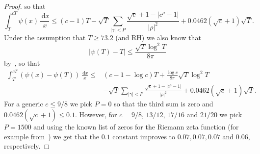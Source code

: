 \documentclass[a4paper,11pt]{amsart}
\newcommand{\ideal}[1]{\mathfrak{{#1}}}
\newcommand{\p}{\ideal{p}}
\newcommand{\dd}{\,\mathrm{d}}
\DeclareMathOperator{\Imm}{Im}
\DeclareMathOperator{\Ree}{Re}
\theoremstyle{remark}
\begin{document}
\begin{proof}
%
%
so that
\[
\int_T^{cT}\psi(x)\,\frac{\!\dd x}{x}
\leq
(c-1)T - \sqrt{T}\sum_{|\gamma|<P} \frac{\sqrt{c}+1-|c^\rho-1|}{|\rho|^2} + 0.0462(\sqrt{c}+1)\sqrt{T}.
\]
Under the assumption that $T\geq 73.2$ (and RH) we also know that
\[
|\psi(T)-T|\leq \frac{\sqrt{T}\log^2 T}{8\pi}
\]
by~\cite[Th.~10]{Schoenfeld1}, so that
\begin{align*}
\int_T^{cT}(\psi(x)-\psi(T))\,\frac{\!\dd x}{x}
\leq& (c-1 - \log c)T
      + \frac{\log c}{8\pi}\sqrt{T}\log^2T                               \\
%
&     - \sqrt{T}\sum_{|\gamma|<P} \frac{\sqrt{c}+1-|c^\rho-1|}{|\rho|^2}
      + 0.0462(\sqrt{c}+1)\sqrt{T}.
\end{align*}
For a generic $c \leq 9/8$ we pick $P=0$ so that the third sum is zero and $0.0462(\sqrt{c}+1) \leq 0.1$.
%
However, for $c=9/8$, $13/12$, $17/16$ and $21/20$ we pick $P=1500$ and using the known list of zeros for
the Riemann zeta function (for example from~\cite{OdlyzkoTablesZeros}) we get that the $0.1$ constant
improves to $0.07, 0.07, 0.07$ and $0.06$, respectively.
%

\end{proof}
\end{document}
